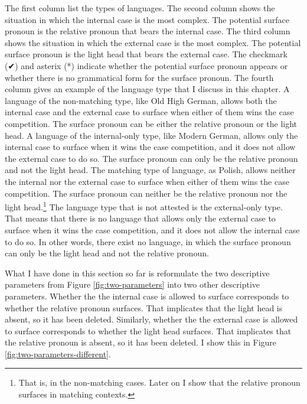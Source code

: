 The first column list the types of languages.
The second column shows the situation in which the internal case is the most complex. The potential surface pronoun is the relative pronoun that bears the internal case.
The third column shows the situation in which the external case is the most complex. The potential surface pronoun is the light head that bears the external case.
The checkmark (✔) and asterix (*) indicate whether the potential surface pronoun appears or whether there is no grammatical form for the surface pronoun.
The fourth column gives an example of the language type that I discuss in this chapter.
A language of the non-matching type, like Old High German, allows both the internal case and the external case to surface when either of them wins the case competition. The surface pronoun can be either the relative pronoun or the light head.
A language of the internal-only type, like Modern German, allows only the internal case to surface when it wins the case competition, and it does not allow the external case to do so. The surface pronoun can only be the relative pronoun and not the light head.
The matching type of language, as Polish, allows neither the internal nor the external case to surface when either of them wins the case competition. The surface pronoun can neither be the relative pronoun nor the light head.\footnote{
That is, in the non-matching cases. Later on I show that the relative pronoun surfaces in matching contexts.
}
The language type that is not attested is the external-only type. That means that there is no language that allows only the external case to surface when it wins the case competition, and it does not allow the internal case to do so. In other words, there exist no language, in which the surface pronoun can only be the light head and not the relative pronoun.

What I have done in this section so far is reformulate the two descriptive parameters from Figure \ref{fig:two-parameters} into two other descriptive parameters.
Whether the the internal case is allowed to surface corresponds to whether the relative pronoun surfaces. That implicates that the light head is absent, so it has been deleted.
Similarly, whether the the external case is allowed to surface corresponds to whether the light head surfaces. That implicates that the relative pronoun is absent, so it has been deleted.
I show this in Figure \ref{fig:two-parameters-different}.

